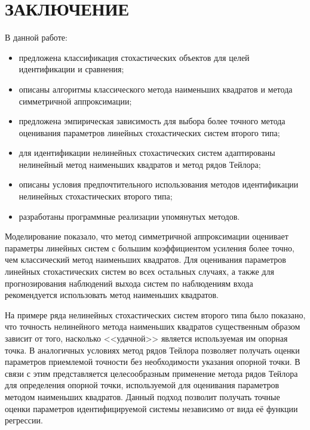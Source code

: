 \chapter*{ЗАКЛЮЧЕНИЕ}

В данной работе:
\begin{itemize}
\item предложена классификация стохастических объектов для целей
  идентификации и сравнения;
\item описаны алгоритмы классического метода наименьших квадратов и
  метода симметричной аппроксимации;
\item предложена эмпирическая зависимость для выбора более точного метода
  оценивания параметров линейных стохастических систем второго типа;
\item для идентификации нелинейных стохастических
  систем адаптированы нелинейный метод наименьших квадратов и метод рядов Тейлора;
\item описаны условия предпочтительного использования
  методов идентификации нелинейных стохастических второго типа;
\item разработаны программные реализации упомянутых методов.
\end{itemize}

Моделирование показало, что метод симметричной аппроксимации оценивает
параметры линейных систем с большим коэффициентом усиления более точно,
чем классический метод наименьших квадратов.
Для оценивания параметров линейных стохастических систем во всех остальных случаях,
а также для прогнозирования наблюдений выхода систем по наблюдениям входа
рекомендуется использовать метод наименьших квадратов.

На примере ряда нелинейных стохастических систем второго типа было показано,
что точность нелинейного метода наименьших квадратов существенным образом
зависит от того, насколько <<удачной>> является используемая им опорная точка.
В аналогичных условиях метод рядов Тейлора позволяет получать оценки параметров
приемлемой точности без необходимости указания опорной точки.
В связи с этим представляется целесообразным применение метода рядов Тейлора
для определения опорной точки, используемой для оценивания параметров методом
наименьших квадратов.
Данный подход позволит получать точные оценки параметров идентифицируемой системы
независимо от вида её функции регрессии.
